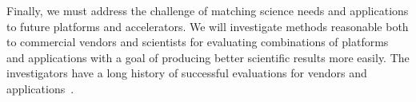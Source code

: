 Finally, we must address the challenge of matching science needs and applications to future
platforms and accelerators. We will investigate methods reasonable both to commercial vendors
and scientists for evaluating combinations of platforms and applications with a goal of producing
better scientific results more easily. The investigators have a long history of successful evaluations
for vendors and 
applications~\cite{Agarwal2008,Bader2008d,Bader2007b,Bader2007c,Bader2007d,Riedy2011b,Agarwal2010,Ye2010,Kang2009,Bader2008a,Bader2007,Madduri2007,Bader2006,Bader2006d,Bader2006j,Bader2005c,tridiag-sisc}.
